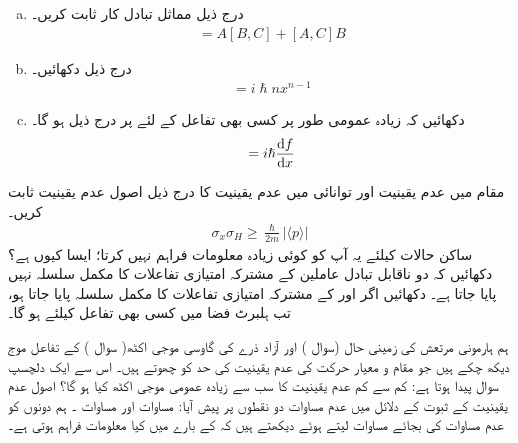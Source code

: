 \begin{enumerate}[a.]
\item
 درج ذیل مماثل  تبادل کار  ثابت کریں۔
\begin{align}
[ AB,C ] = A[B,C] + [A,C]B
\end{align}
\item
 درج ذیل دکھائیں۔ 
\begin{align*}
[x^{n},p] = i\hslash nx^{n-1}
\end{align*}
\item
 دکھائیں کہ زیادہ عمومی طور پر  کسی بھی تفاعل  کے لئے  پر درج ذیل ہو گا۔ 
\begin{align}
[f(x) , p] = i\hslash \frac{\dif f}{\dif x}
\end{align}
\end{enumerate}
مقام  میں عدم یقینیت اور توانائی   میں عدم یقینیت کا درج ذیل اصول  عدم یقینیت ثابت کریں۔
\begin{align*}
\sigma_{x}\sigma_{H} \geq \frac{\hslash}{2m}|\langle p \rangle |
\end{align*}
ساکن حالات کیلئے یہ آپ کو کوئی زیادہ معلومات فراہم نہیں کرتا؛ ایسا کیوں ہے؟
دکھائیں کہ دو ناقابل تبادل عاملین کے مشترکہ امتیازی  تفاعلات  کا مکمل سلسلہ نہیں پایا جاتا  ہے۔
 دکھائیں اگر  اور  کے مشترکہ امتیازی تفاعلات کا مکمل سلسلہ پایا جاتا ہو،  تب ہلبرٹ فضا میں کسی بھی تفاعل کیلئے  ہو گا۔


ہم ہارمونی مرتعش کی زمینی حال (سوال )  اور آزاد ذرے کی گاوسی موجی اکٹھ( سوال ) کے تفاعل موج دیکھ چکے ہیں جو مقام و  معیار حرکت کی عدم یقینیت کی
 حد  کو چھوتے ہیں۔ اس سے ایک دلچسپ سوال پیدا ہوتا ہے:  کم سے کم عدم یقینیت کا سب سے زیادہ عمومی موجی اکٹھ کیا ہو گا؟ اصول  عدم یقینیت  کے ثبوت کے دلائل میں عدم مساوات دو نقطوں پر پیش آیا:  مساوات  اور مساوات ۔ ہم دونوں کو عدم مساوات کی بجائے  مساوات لیتے ہوئے دیکھتے ہیں کہ   کے بارے میں کیا معلومات فراہم ہوتی ہے۔
 
